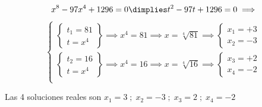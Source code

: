 \documentclass[palatino,nosec]{Docencia}
\begin{document}
\begin{problem}
\[
x^8-97x^4+1296 = 0 \dimplies t^2-97t+1296=0 \implies 
\]
\[\left\{
\begin{array}{c}
	\left\{\begin{array}{l}
		t_1=81\\
		t=x^4
	\end{array}\right\} \implies x^4=81\implies x=\sqrt[4]{81} \implies \left\{\begin{array}{l} x_1=+3\\x_2=-3\end{array}\right. \\
	\left\{\begin{array}{l}
		t_2=16\\
		t=x^4
	\end{array}\right\} \implies x^4=16\implies x=\sqrt[4]{16} \implies \left\{\begin{array}{l} x_3=+2\\x_4=-2\end{array}\right. \\
\end{array}
\right.
\]

Las 4 soluciones reales son $x_1=3\;;\;x_2=-3\;;\;x_3=2\;;\;x_4=-2$

\end{problem}
\end{document}
